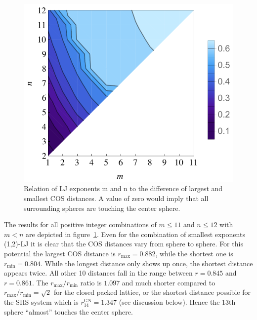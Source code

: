 \begin{figure}
    \centering
    \includegraphics[width=.8\textwidth]{gregory-newton/N14.pdf}
    \caption{Relation of \acs{LJ} exponents m and n to the difference of
    largest and smallest \acs{COS} distances.  A value of zero would imply that
    all surrounding spheres are touching the center sphere.}
    \label{fig:gregorynewton-N14}
\end{figure}

The results for all positive integer combinations of $m\leq11$ and $n\leq12$
with $m<n$ are depicted in figure~\ref{fig:gregorynewton-N14}. Even for the
combination of smallest exponents (1,2)-\ac{LJ} it is clear that the \ac{COS}
distances vary from sphere to sphere. For this potential the largest \ac{COS}
distance is $r_\text{max}=0.882$, while the shortest one is
$r_\text{min}=0.804$. While the longest distance only shows up once, the
shortest distance appears twice. All other 10 distances fall in the range
between $r = 0.845$ and $r = 0.861$. The $r_\text{max} /r_\text{min}$ ratio is
$1.097$ and much shorter compared to $r_\text{max} /r_\text{min}= \sqrt{2}$ for
the closed packed lattice, or the shortest distance possible for the \ac{SHS}
system which is $r_{14}^\text{GN} = 1.347$ (see discussion below). Hence the
13th sphere ``almost'' touches the center sphere.

